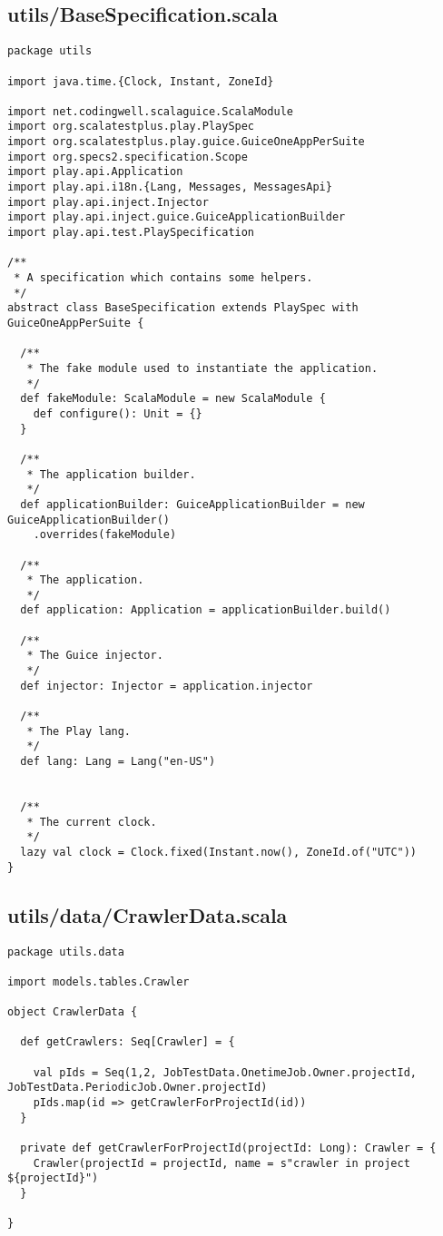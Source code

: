 \subsection{utils/BaseSpecification.scala}
\begin{lstlisting}
package utils

import java.time.{Clock, Instant, ZoneId}

import net.codingwell.scalaguice.ScalaModule
import org.scalatestplus.play.PlaySpec
import org.scalatestplus.play.guice.GuiceOneAppPerSuite
import org.specs2.specification.Scope
import play.api.Application
import play.api.i18n.{Lang, Messages, MessagesApi}
import play.api.inject.Injector
import play.api.inject.guice.GuiceApplicationBuilder
import play.api.test.PlaySpecification

/**
 * A specification which contains some helpers.
 */
abstract class BaseSpecification extends PlaySpec with GuiceOneAppPerSuite {

  /**
   * The fake module used to instantiate the application.
   */
  def fakeModule: ScalaModule = new ScalaModule {
    def configure(): Unit = {}
  }

  /**
   * The application builder.
   */
  def applicationBuilder: GuiceApplicationBuilder = new GuiceApplicationBuilder()
    .overrides(fakeModule)

  /**
   * The application.
   */
  def application: Application = applicationBuilder.build()

  /**
   * The Guice injector.
   */
  def injector: Injector = application.injector

  /**
   * The Play lang.
   */
  def lang: Lang = Lang("en-US")


  /**
   * The current clock.
   */
  lazy val clock = Clock.fixed(Instant.now(), ZoneId.of("UTC"))
}
\end{lstlisting}
\subsection{utils/data/CrawlerData.scala}
\begin{lstlisting}
package utils.data

import models.tables.Crawler

object CrawlerData {

  def getCrawlers: Seq[Crawler] = {

    val pIds = Seq(1,2, JobTestData.OnetimeJob.Owner.projectId, JobTestData.PeriodicJob.Owner.projectId)
    pIds.map(id => getCrawlerForProjectId(id))
  }

  private def getCrawlerForProjectId(projectId: Long): Crawler = {
    Crawler(projectId = projectId, name = s"crawler in project ${projectId}")
  }

}
\end{lstlisting}
